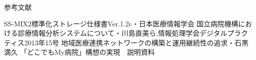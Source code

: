 参考文献

\begin{thebibliography}{9}
  SS-MIX2標準化ストレージ仕様書Ver.1.2c・日本医療情報学会
   国立病院機構における診療情報分析システムについて・川島直美ら,情報処理学会デジタルプラクティス2013年15号
   地域医療連携ネットワークの構築と運用継続性の追求・石黒満久
   「どこでもMy病院」構想の実現　説明資料
\end{thebibliography}


